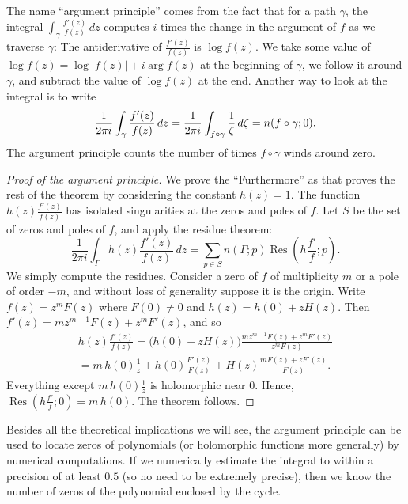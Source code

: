 \documentclass[12pt,openany]{book}
\newcommand{\avoidbreak}{\postdisplaypenalty=100}
\newcommand{\sabs}[1]{\lvert {#1} \rvert}
\newcommand{\myquote}[1]{``#1''}
\theoremstyle{plain}
\theoremstyle{remark}
\theoremstyle{definition}
\theoremstyle{exercise}
\theoremstyle{example}
\begin{document}
The name \myquote{argument principle} comes from the fact that for a path
$\gamma$,
the integral
$\int_{\gamma} \frac{f'(z)}{f(z)} \, dz$
computes $i$ times the change in the argument of $f$ as we traverse $\gamma$:
The antiderivative of
$\frac{f'(z)}{f(z)}$
is $\log f(z)$.
We take some value of $\log f(z) = \log \sabs{f(z)} + i \arg f(z)$
at the beginning of $\gamma$, we follow it
around $\gamma$, and subtract the value of $\log f(z)$ at the end.
Another way to look at the integral is to write
\begin{equation*}
\frac{1}{2\pi i}
\int_{\gamma} \frac{f'(z)}{f(z)} \, dz = 
\frac{1}{2\pi i}
\int_{f \circ \gamma} \frac{1}{\zeta} \, d\zeta 
=
n(f \circ \gamma ; 0 )
.
\avoidbreak
\end{equation*}
The
argument principle counts the number of times 
$f \circ \gamma$ winds around zero.

\begin{proof}[Proof of the argument principle]
We prove the \myquote{Furthermore} as that proves the rest of the theorem by
considering the constant $h(z) = 1$.
The function $h(z) \frac{f'(z)}{f(z)}$ has isolated singularities
at the zeros and poles of $f$.  Let $S$ be the set of zeros and poles of $f$,
and apply the residue theorem:
\begin{equation*}
\frac{1}{2\pi i}
\int_\Gamma h(z) \frac{f'(z)}{f(z)} \, dz
=
\sum_{p \in S} n(\Gamma;p)\operatorname{Res}\left(h \frac{f'}{f};p\right) .
\end{equation*}
We simply compute the residues.
Consider a zero of $f$ of multiplicity $m$ or a pole of order $-m$, and
without loss of generality suppose it is the origin.
Write $f(z)  = z^m F(z)$ where $F(0) \not=0$
and $h(z) = h(0) + z H(z)$.
Then $f'(z) = m z^{m-1} F(z) + z^m F'(z)$, and so
\begin{multline*}
h(z) \frac{f'(z)}{f(z)}
=
\bigl( h(0) + z H(z) \bigr)
\frac{m z^{m-1} F(z) + z^m F'(z)}{z^m F(z)}
\\
=
m\, h(0) 
\frac{1}{z}
+
h(0) 
\frac{F'(z)}{F(z)}
+
H(z)
\frac{m F(z) + z F'(z)}{F(z)} .
\end{multline*}
Everything except $m\, h(0) \frac{1}{z}$ is holomorphic near $0$.
Hence, $\operatorname{Res}\left(h\frac{f'}{f};0\right) = m\, h(0)$.
The theorem follows.
\end{proof}

Besides all the theoretical implications we will see,
the argument principle can be used to locate zeros of polynomials
(or holomorphic functions more generally)
by numerical computations.  If we numerically estimate the integral to
within a precision of at least $0.5$ (so no need to be extremely precise),
then we know the number of zeros 
of the polynomial enclosed by the cycle.
\end{document}
